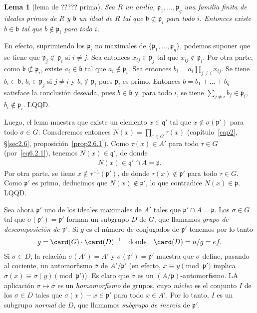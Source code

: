 \documentclass[bibtotoc,leqno,spanish]{amsbook}
\newcommand{\idl}[1]{\mathfrak{#1}}
\newcommand{\QED}{LQQD.}
\newcommand{\oline}[1]{\overline{#1}}
\numberwithin{equation}{section}
\theoremstyle{note}
\theoremstyle{note}
\newtheorem{lemma}{Lema}
\theoremstyle{rem}
\numberwithin{theorem}{section}
\numberwithin{proposition}{section}
\numberwithin{definition}{section}
\numberwithin{lemma}{section}
\numberwithin{corollary}{section}
\numberwithin{example}{section}
\numberwithin{footnote}{section}%
\begin{document}
\begin{lemma}[lema de ????? prima]
Sea $R$ un anillo, $\idl{p}_{1},\dots,\idl{p}_{q}$ una familia finita de ideales primos de $R$ y $\idl{b}$
un ideal de $R$ tal que $\idl{b}\not\subset\idl{p}_{i}$ para todo $i$. Entonces existe $b\in\idl{b}$ tal que
$b\notin\idl{p}_{i}$ para todo $i$.
\end{lemma}

En efecto, suprimiendo los $\idl{p}_{i}$ no maximales de
$\{\idl{p}_{1},\dots,\idl{p}_{q}\}$, podemos suponer
que se tiene que $\idl{p}_{j}\not\subset\idl{p}_{i}$ si $i\neq j$. Sea entonces
$x_{ij}\in\idl{p}_{j}$ tal que
$x_{ij}\notin\idl{p}_{i}$. Por otra parte, como $\idl{b}\not\subset\idl{p}_{i}$, existe
$a_{i}\in\idl{b}$
tal que $a_{i}\notin\idl{p}_{i}$. Sea entonces $b_{i} = a_{i}\prod_{j\neq i}x_{ij}$. Se tiene
$b_{i}\in\idl{b}$, $b_{i}\in\idl{p}_{j}$ si $j\neq i$ y $b_{i}\notin\idl{p}_{i}$ pues
$\idl{p}_{i}$ es primo.
Entonces $b=b_{1}+\dots+b_{q}$ satisface la conclusi\'on deseada, pues $b\in\idl{b}$ y,
para todo $i$, se tiene
$\sum_{j\neq i}b_{j}\in\idl{p}_{i}$, $b_{i}\notin\idl{p}_{i}$. \QED

Luego, el lema muestra que existe un elemento $x\in\idl{q}'$ tal que $x\notin\sigma(\idl{p}')$ para todo
$\sigma\in G$. Consderemos entonces $N(x) = \prod_{\tau\in G}\tau(x)$ (cap\'itulo~\ref{cap2}, \S\ref{sec2.6},
proposici\'on~\ref{prop2.6.1}).
Como $\tau(x)\in A'$ para todo $\tau\in G$ (por~\eqref{eq6.2.1}),
tenemos $N(x)\in\idl{q}'$, de donde
\begin{gather*}
N(x) \in \idl{q}'\cap A = \idl{p}.
\end{gather*}
Por otra parte, se tiene $x\notin\tau^{-1}(\idl{p}')$, de donde $\tau(x)\notin\idl{p}'$
para todo
$\tau\in G$. Como $\idl{p}'$ es primo, deducimos que $N(x)\notin\idl{p}'$, lo que
contradice $N(x)\in\idl{p}$. \QED

Sea ahora $\idl{p}'$ uno de los ideales maximales de $A'$ tales que $\idl{p}'\cap A = \idl{p}$. Los $\sigma\in G$
tal que $\sigma(\idl{p}') = \idl{p}'$ forman un subgrupo $D$ de $G$, que llamamos {\em grupo de descomposici\'on de
$\idl{p}'$.} Si $g$ es el n\'umero de conjugados de $\idl{p}'$ tenemos por lo tanto
\begin{gather}\label{eq6.2.2}
g=\card(G)\cdot\card(D)^{-1}\quad\text{donde}\quad\card(D) = n/g = ef.
\end{gather}
Si $\sigma\in D$, la relaci\'on $\sigma(A') = A'$ y $\sigma(\idl{p}') = \idl{p}'$ muestra que $\sigma$ define,
pasando al cociente, un automorfismo $\oline\sigma$ de $A'/\idl{p}'$ (en efecto,
$x\equiv y\pmod{\idl{p}'}$ implica $\sigma(x)\equiv\sigma(y)\pmod{\idl{p}'}$). Es claro que $\oline\sigma$
es un $(A/\idl{p})$-automorfismo. LA aplicaci\'on $\sigma\mapsto\oline\sigma$ es un {\em homomorfismo} de grupos,
cuyo {\em n\'ucleo} es el conjunto $I$ de los $\sigma\in D$ tales que $\sigma(x)-x\in\idl{p}'$ para todo $x\in A'$.
Por lo tanto, $I$ es un subgrupo {\em normal} de $D$, que llamamos {\em subgrupo de inercia} de $\idl{p}'$.
\end{document}
